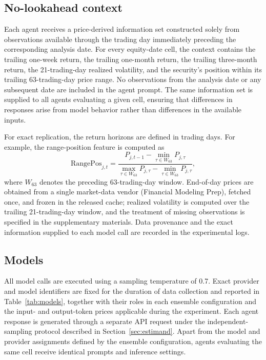 \documentclass{ieeeaccess}
\begin{document}
\subsection{No-lookahead context}
Each agent receives a price-derived information set constructed solely from
observations available through the trading day immediately preceding the
corresponding analysis date. For every equity-date cell, the context contains
the trailing one-week return, the trailing one-month return, the trailing
three-month return, the 21-trading-day realized volatility, and the security's
position within its trailing 63-trading-day price range. No observations from
the analysis date or any subsequent date are included in the agent prompt. The
same information set is supplied to all agents evaluating a given cell, ensuring
that differences in responses arise from model behavior rather than differences
in the available inputs.

For exact replication, the return horizons are defined in trading days. For
example, the range-position feature is computed as
\begin{equation}
\mathrm{RangePos}_{j,t}=\frac{P_{j,t-1}-\min_{\tau\in W_{63}}P_{j,\tau}}
{\max_{\tau\in W_{63}}P_{j,\tau}-\min_{\tau\in W_{63}}P_{j,\tau}},
\end{equation}
where $W_{63}$ denotes the preceding 63-trading-day window. End-of-day prices
are obtained from a single market-data vendor (Financial Modeling Prep), fetched
once, and frozen in the released cache; realized volatility is computed over the
trailing 21-trading-day window, and the treatment of missing observations is
specified in the supplementary materials. Data provenance and the exact
information supplied to each model call are recorded in the experimental logs.

\subsection{Models}
All model calls are executed using a sampling temperature of 0.7. Exact provider
and model identifiers are fixed for the duration of data collection and reported
in Table~\ref{tab:models}, together with their roles in each ensemble
configuration and the input- and output-token prices applicable during the
experiment. Each agent response is generated through a separate API request
under the independent-sampling protocol described in
Section~\ref{sec:estimand}. Apart from the model and provider assignments
defined by the ensemble configuration, agents evaluating the same cell receive
identical prompts and inference settings.
\end{document}
